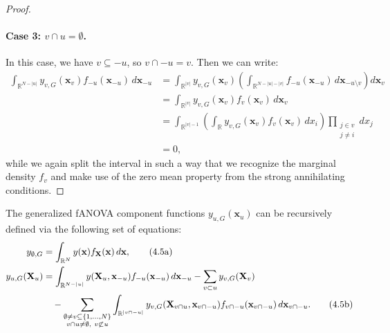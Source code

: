 \begin{proof}
\paragraph{Case 3: \( v \cap u = \emptyset \).}
In this case, we have \( v \subseteq -u \), so \( v \cap -u = v \). Then we can write:
\[
\begin{aligned}
\int_{\mathbb{R}^{N - |u|}} y_{v,G}(\mathbf{x}_v) f_{-u}(\mathbf{x}_{-u}) \, d\mathbf{x}_{-u}
&= \int_{\mathbb{R}^{|v|}} y_{v,G}(\mathbf{x}_v)
\left( \int_{\mathbb{R}^{N - |u| - |v|}} f_{-u}(\mathbf{x}_{-u}) \, d\mathbf{x}_{-u \setminus v} \right)
d\mathbf{x}_v \\
&= \int_{\mathbb{R}^{|v|}} y_{v,G}(\mathbf{x}_v) f_v(\mathbf{x}_v) \, d\mathbf{x}_v \\
&= \int_{\mathbb{R}^{|v|-1}} \left( \int_{\mathbb{R}} y_{v,G}(\mathbf{x}_v) f_v(\mathbf{x}_v) \, dx_i \right)
\prod_{\substack{j \in v \\ j \ne i}} dx_j \\
&= 0,
\end{aligned}
\]
while we again split the interval in such a way that we recognize the marginal density $f_v$ and make use of the zero mean property from the strong annihilating conditions.

\end{proof}


\begin{theorem}
The generalized fANOVA component functions \( y_{u,G}(\mathbf{x}_u) \) can be recursively defined via the following set of equations:
\begin{align}
y_{\emptyset,G} &= \int_{\mathbb{R}^N} y(\mathbf{x}) f_{\mathbf{X}}(\mathbf{x}) \, d\mathbf{x}, \tag{4.5a} \\
y_{u,G}(\mathbf{X}_u) &= \int_{\mathbb{R}^{N - |u|}} y(\mathbf{X}_u, \mathbf{x}_{-u}) f_{-u}(\mathbf{x}_{-u}) \, d\mathbf{x}_{-u}
- \sum_{v \subset u} y_{v,G}(\mathbf{X}_v) \notag \\
&\quad - \sum_{\substack{\emptyset \ne v \subseteq \{1,\dots,N\} \\ v \cap u \ne \emptyset,\ v \not\subset u}} 
\int_{\mathbb{R}^{|v \cap -u|}} y_{v,G}(\mathbf{X}_{v \cap u}, \mathbf{x}_{v \cap -u}) f_{v \cap -u}(\mathbf{x}_{v \cap -u}) \, d\mathbf{x}_{v \cap -u}. \tag{4.5b}
\end{align}
\end{theorem}


